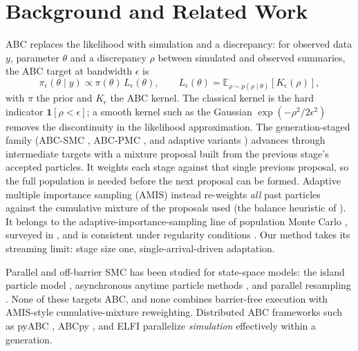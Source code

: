 \documentclass[pdflatex,sn-mathphys-num]{sn-jnl}
\theoremstyle{plain}
\theoremstyle{definition}
\begin{document}
\section{Background and Related Work}\label{sec:background}\label{sec:background-abc}\label{sec:background-sequential}\label{sec:background-amis}\label{sec:background-distributed}
ABC replaces the likelihood with simulation and a discrepancy: for observed data $y$, parameter $\theta$ and a discrepancy $\rho$ between simulated and observed summaries, the ABC target at bandwidth $\epsilon$ is
\begin{equation}
\pi_{\epsilon}(\theta \mid y) \propto \pi(\theta)\, L_{\epsilon}(\theta),
\qquad
L_{\epsilon}(\theta) = \mathbb{E}_{\rho \sim p(\rho \mid \theta)}\!\left[K_{\epsilon}(\rho)\right],
\label{eq:abc-target}
\end{equation}
with $\pi$ the prior and $K_\epsilon$ the ABC kernel. The classical kernel is the hard indicator $\mathbf{1}[\rho<\epsilon]$; a smooth kernel such as the Gaussian $\exp(-\rho^2/2\epsilon^2)$ \cite{wilkinson2013,fearnhead2012} removes the discontinuity in the likelihood approximation. The generation-staged family (ABC-SMC \cite{sisson2007,toni2009abcsmc}, ABC-PMC \cite{beaumont2009adaptive}, and adaptive variants \cite{delmoral2012adaptive,drovandi2011,lenormand2013apmc}) advances through intermediate targets with a mixture proposal built from the previous stage's accepted particles. It weights each stage against that single previous proposal, so the full population is needed before the next proposal can be formed. Adaptive multiple importance sampling (AMIS) \cite{cornuet2012amis} instead re-weights \emph{all} past particles against the cumulative mixture of the proposals used (the balance heuristic of \cite{veach1995}). It belongs to the adaptive-importance-sampling line of population Monte Carlo \cite{cappe2004pmc}, surveyed in \cite{bugallo2017ais}, and is consistent under regularity conditions \cite{marin2019consistency}. Our method takes its streaming limit: stage size one, single-arrival-driven adaptation.

Parallel and off-barrier SMC has been studied for state-space models: the island particle model \cite{verge2015island}, asynchronous anytime particle methods \cite{paige2014cascade}, and parallel resampling \cite{murray2016anytime}. None of these targets ABC, and none combines barrier-free execution with AMIS-style cumulative-mixture reweighting. Distributed ABC frameworks such as pyABC \cite{klinger2018pyabc,schalte2022pyabc}, ABCpy \cite{dutta2017abcpy}, and ELFI \cite{lintusaari2018elfi} parallelize \emph{simulation} effectively within a generation.
\end{document}
